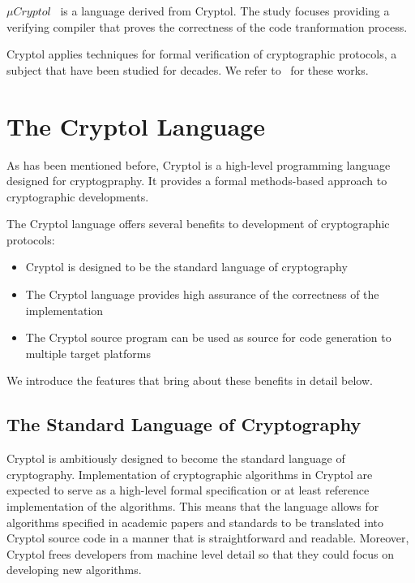 \documentclass[a4paper, notitlepage]{report}
\renewcommand{\paragraph}[1]{\vspace*{1em}\noindent\textbf{#1}\hspace*{1em}}
\begin{document}
${\mu}Cryptol$~\cite{shields2006language,pike2006verifying} is a language
 derived from Cryptol. The 
study focuses providing a verifying compiler that proves the correctness
of the code tranformation process.

Cryptol applies techniques for formal verification of cryptographic protocols,
a subject that have been studied for decades. We refer to~\cite{meadows1994formal} for these works.

\section{The Cryptol Language}
\label{sec:cryptol}

As has been mentioned before, Cryptol is a high-level programming language
designed for cryptogpraphy. It provides a formal methods-based approach
to cryptographic developments.

The Cryptol language offers several benefits to development of cryptographic
protocols:
\begin{itemize}
\item Cryptol is designed to be the standard language of cryptography
\item The Cryptol language provides high assurance of the correctness
of the implementation
\item The Cryptol source program can be used as source for code generation
to multiple target platforms
\end{itemize} 

We introduce the features that bring about these benefits in detail below.

\subsection{The Standard Language of Cryptography}

Cryptol is ambitiously designed to become the standard language of cryptography.
Implementation of cryptographic algorithms in Cryptol are expected to serve as 
a high-level formal specification or at least reference implementation 
of the algorithms.
This means that the language allows for algorithms specified in academic
papers and standards to be translated into Cryptol source code in a manner that
is straightforward and readable.
Moreover, Cryptol frees developers from machine level detail
so that they could focus on developing new algorithms.
\end{document}
